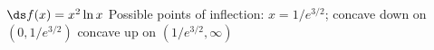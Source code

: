 {$\ds f(x) = x^2\ln x$
}
{Possible points of inflection: $x=1/e^{3/2}$;
concave down on $(0,1/e^{3/2})$
concave up on $(1/e^{3/2},\infty)$
}
